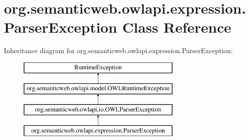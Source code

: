 \hypertarget{classorg_1_1semanticweb_1_1owlapi_1_1expression_1_1_parser_exception}{\section{org.\-semanticweb.\-owlapi.\-expression.\-Parser\-Exception Class Reference}
\label{classorg_1_1semanticweb_1_1owlapi_1_1expression_1_1_parser_exception}
}
Inheritance diagram for org.\-semanticweb.\-owlapi.\-expression.\-Parser\-Exception\-:\begin{figure}[H]
\begin{center}
\leavevmode
\includegraphics[height=4.000000cm]{classorg_1_1semanticweb_1_1owlapi_1_1expression_1_1_parser_exception}
\end{center}
\end{figure}
